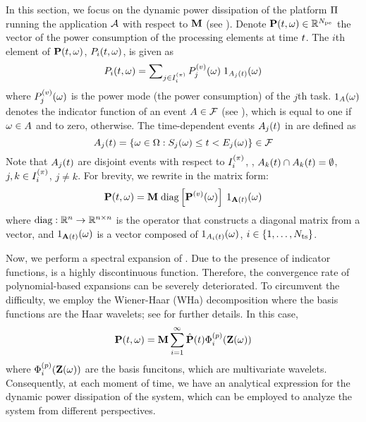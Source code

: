 In this section, we focus on the dynamic power dissipation of the platform $\Pi$ running the application $\mathcal{A}$ with respect to $\mathbf{M}$ (see ). Denote $\mathbf{P}(t, \omega) \in \mathbb{R}^{N_\text{pe}}$ the vector of the power consumption of the processing elements at time $t$. The $i$th element of $\mathbf{P}(t, \omega)$, $P_i(t, \omega)$, is given as
\begin{equation} \elabel{processor-power}
  \PP_i(\t, \o) = \sum\nolimits_{j \in \iProcessor_i} \PT_j(\o) \; \I_{\event_j(\t)}(\o)
\end{equation}
where $P^{(v)}_j(\omega)$ is the power mode (the power consumption) of the $j$th task. $1_A(\omega)$ denotes the indicator function of an event $A \in \mathcal{F}$ (see ), which is equal to one if $\omega \in A$ and to zero, otherwise. The time-dependent events $A_j(t)$ in  are defined as
\[
  A_j(t) = \{ \omega \in \Omega: S_j(\omega) \leq t < E_j(\omega) \} \in \mathcal{F}
\]
Note that $A_j(t)$ are disjoint events with respect to $I^{(\pi)}_i$, \ie, $A_k(t) \cap A_k(t) = \emptyset$, $j, k \in I^{(\pi)}_i$, $j \neq k$. For brevity, we rewrite  in the matrix form:
\begin{equation} \elabel{platform-power}
  \vPP(\t, \o) = \mM \; \oDiag{\vPT(\o)} \: \I_{\m{\event}(\t)}(\o)
\end{equation}
where $\oDiag: \real^n \to \real^{n \times n}$ is the operator that constructs a diagonal matrix from a vector, and $1_{\mathbf{A}(t)}(\omega)$ is a vector composed of $1_{A_i(t)}(\omega)$, $i \in \{ 1, \dots, {N_\text{ts}} \}$.

Now, we perform a spectral expansion of . Due to the presence of indicator functions,  is a highly discontinuous function. Therefore, the convergence rate of polynomial-based expansions can be severely deteriorated. To circumvent the difficulty, we employ the Wiener-Haar (WHa) decomposition \cite{maitre2004} where the basis functions are the Haar wavelets; see  for further details. In this case,
\[
  \mathbf{P}(t, \omega) = \mathbf{M} \sum_{i = 1}^\infty \hat{\mathbf{P}}(t) \Phi^{(p)}_i(\mathbf{Z}(\omega))
\]
where $\Phi^{(p)}_i(\mathbf{Z}(\omega))$ are the basis funcitons, which are multivariate wavelets. Consequently, at each moment of time, we have an analytical expression for the dynamic power dissipation of the system, which can be employed to analyze the system from different perspectives.
